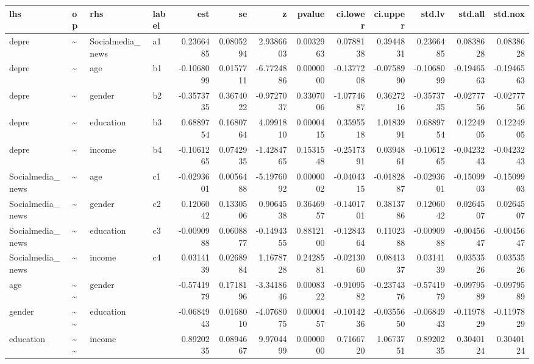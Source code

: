 \documentclass[
]{article}
\begin{document}
\begin{table}[!h]
\centering
\begin{tabular}[t]{llllrrrrrrrrr}
\toprule
lhs & op & rhs & label & est & se & z & pvalue & ci.lower & ci.upper & std.lv & std.all & std.nox\\
\midrule
depre & \textasciitilde{} & Socialmedia\_news & a1 & 0.2366485 & 0.0805294 & 2.9386603 & 0.0032963 & 0.0788138 & 0.3944831 & 0.2366485 & 0.0838628 & 0.0838628\\
depre & \textasciitilde{} & age & b1 & -0.1068099 & 0.0157711 & -6.7724886 & 0.0000000 & -0.1377208 & -0.0758990 & -0.1068099 & -0.1946563 & -0.1946563\\
depre & \textasciitilde{} & gender & b2 & -0.3573735 & 0.3674022 & -0.9727037 & 0.3307006 & -1.0774687 & 0.3627216 & -0.3573735 & -0.0277756 & -0.0277756\\
depre & \textasciitilde{} & education & b3 & 0.6889754 & 0.1680764 & 4.0991810 & 0.0000415 & 0.3595518 & 1.0183991 & 0.6889754 & 0.1224905 & 0.1224905\\
depre & \textasciitilde{} & income & b4 & -0.1061265 & 0.0742935 & -1.4284765 & 0.1531548 & -0.2517391 & 0.0394861 & -0.1061265 & -0.0423243 & -0.0423243\\
\addlinespace
Socialmedia\_news & \textasciitilde{} & age & c1 & -0.0293601 & 0.0056488 & -5.1976092 & 0.0000002 & -0.0404315 & -0.0182887 & -0.0293601 & -0.1509903 & -0.1509903\\
Socialmedia\_news & \textasciitilde{} & gender & c2 & 0.1206042 & 0.1330506 & 0.9064538 & 0.3646957 & -0.1401701 & 0.3813786 & 0.1206042 & 0.0264507 & 0.0264507\\
Socialmedia\_news & \textasciitilde{} & education & c3 & -0.0090988 & 0.0608877 & -0.1494355 & 0.8812100 & -0.1284364 & 0.1102388 & -0.0090988 & -0.0045647 & -0.0045647\\
Socialmedia\_news & \textasciitilde{} & income & c4 & 0.0314139 & 0.0268984 & 1.1678728 & 0.2428581 & -0.0213060 & 0.0841337 & 0.0314139 & 0.0353526 & 0.0353526\\
age & \textasciitilde{}\textasciitilde{} & gender &  & -0.5741979 & 0.1718196 & -3.3418646 & 0.0008322 & -0.9109582 & -0.2374376 & -0.5741979 & -0.0979589 & -0.0979589\\
\addlinespace
gender & \textasciitilde{}\textasciitilde{} & education &  & -0.0684943 & 0.0168010 & -4.0768075 & 0.0000457 & -0.1014236 & -0.0355650 & -0.0684943 & -0.1197829 & -0.1197829\\
education & \textasciitilde{}\textasciitilde{} & income &  & 0.8920235 & 0.0894667 & 9.9704499 & 0.0000000 & 0.7166720 & 1.0673751 & 0.8920235 & 0.3040124 & 0.3040124\\

\end{tabular}
\end{table}
\end{document}
